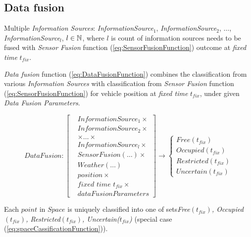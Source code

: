 \subsection{Data fusion}\label{s:dataFusionDefinition}
    \noindent Multiple \emph{Information Sources}: \emph{InformationSource}$_1$, \emph{InformationSource}$_2$, $\dots$, \emph{InformationSource}$_l$, $l\in\mathbb{N}$, where $l$ is count of information sources needs to be fused with \emph{Sensor Fusion} function (\ref{eq:SensorFusionFunction}) outcome at \emph{fixed time} $t_{fix}$.

    \emph{Data fusion} function (\ref{eq:DataFusionFunction}) combines the classification from various \emph{Information Sources} with classification from \emph{Sensor Fusion} function (\ref{eq:SensorFusionFunction}) for vehicle position at \emph{fixed time} $t_{fix}$, under given \emph{Data Fusion Parameters}. 

    \begin{equation}\label{eq:DataFusionFunction}
        DataFusion:
        \left[
        \begin{aligned}
            &InformationSource_1 \times\\
            &InformationSource_2 \times\\
            &\times\dots\times\\
            &InformationSource_l \times\\
            &SensorFusion(\dots)\times\\
            &Weather(\dots)\\
            &position\times\\
            &\textit{fixed time }t_{fix}\times\\
            &dataFusionParameters
        \end{aligned}
        \right]
        \to 
        \begin{cases}
            Free(t_{fix})\\
            Occupied(t_{fix})\\
            Restricted(t_{fix})\\
            Uncertain(t_{fix})
        \end{cases}
    \end{equation}

    Each $point$ in $Space$ is uniquely classified into one of sets\emph{Free$(t_{fix})$, Occupied$(t_{fix})$, Restricted$(t_{fix})$, Uncertain($t_{fix}$)} (special case (\ref{eq:spaceCassificationFunction})).
    
